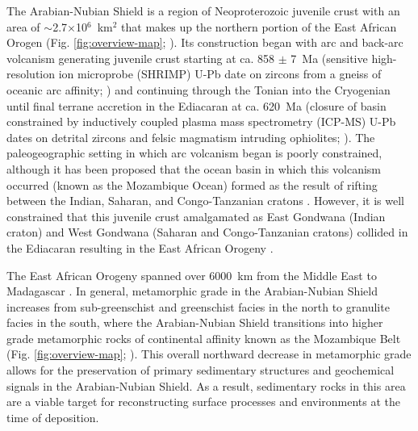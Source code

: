 The Arabian-Nubian Shield is a region of Neoproterozoic juvenile crust with an area of $\sim$2.7$\times$10$^{6}$~km$^{2}$ that makes up the northern portion of the East African Orogen (Fig. \ref{fig:overview-map}; \citealp{Johnson2014a}). Its construction began with arc and back-arc volcanism generating juvenile crust starting at ca. 858 $\pm$ 7~Ma (sensitive high-resolution ion microprobe (SHRIMP) U-Pb date on zircons from a gneiss of oceanic arc affinity; \citealp{Kuster2008a}) and continuing through the Tonian into the Cryogenian until final terrane accretion in the Ediacaran at ca. 620~Ma (closure of basin constrained by inductively coupled plasma mass spectrometry (ICP-MS) U-Pb dates on detrital zircons and felsic magmatism intruding ophiolites; \citealp{Cox2012a, Johnson2014a, Cox2018a}). The paleogeographic setting in which arc volcanism began is poorly constrained, although it has been proposed that the ocean basin in which this volcanism occurred (known as the Mozambique Ocean) formed as the result of rifting between the Indian, Saharan, and Congo-Tanzanian cratons \citep{Johnson2011a}. However, it is well constrained that this juvenile crust amalgamated as East Gondwana (Indian craton) and West Gondwana (Saharan and Congo-Tanzanian cratons) collided in the Ediacaran resulting in the East African Orogeny \citep{Stern1994a, Fritz2013a}.

The East African Orogeny spanned over 6000~km from the Middle East to Madagascar \citep{Collins2002a, Johnson2014a}. In general, metamorphic grade in the Arabian-Nubian Shield increases from sub-greenschist and greenschist facies in the north to granulite facies in the south, where the Arabian-Nubian Shield transitions into higher grade metamorphic rocks of continental affinity known as the Mozambique Belt (Fig. \ref{fig:overview-map}; \citealp{Johnson2011a}). This overall northward decrease in metamorphic grade allows for the preservation of primary sedimentary structures and geochemical signals in the Arabian-Nubian Shield. As a result, sedimentary rocks in this area are a viable target for reconstructing surface processes and environments at the time of deposition.

